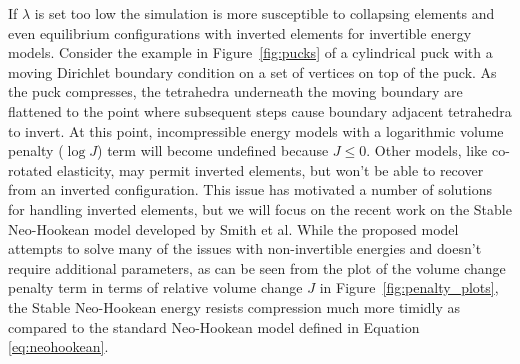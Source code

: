 If $\lambda$ is set too low the simulation is more susceptible to collapsing elements 
and even equilibrium configurations with inverted elements for invertible energy models.
Consider the example in Figure~\ref{fig:pucks} of a cylindrical puck with a moving Dirichlet
boundary condition on a set of vertices on top of the puck. As the puck compresses, the tetrahedra
underneath the moving boundary are flattened to the point where subsequent steps cause boundary
adjacent tetrahedra to invert. At this point, incompressible energy models with a logarithmic volume
penalty ($\log J$) term will become undefined because $J \leq 0$. Other models, like co-rotated
elasticity, may permit inverted elements, but won't be able to recover from an inverted
configuration. This issue has motivated a number of solutions \cite{Irving:2004,Smith:2018} for
handling inverted elements, but we will focus on the recent work on the Stable Neo-Hookean
model developed by Smith et al. While the proposed model attempts to solve many of the issues with
non-invertible energies and doesn't require additional parameters, as can be seen from the plot
of the volume change penalty term in terms of relative volume change $J$ in Figure~\ref{fig:penalty_plots},
the Stable Neo-Hookean energy resists compression much more timidly as compared to
the standard Neo-Hookean model defined in Equation \eqref{eq:neohookean}.
